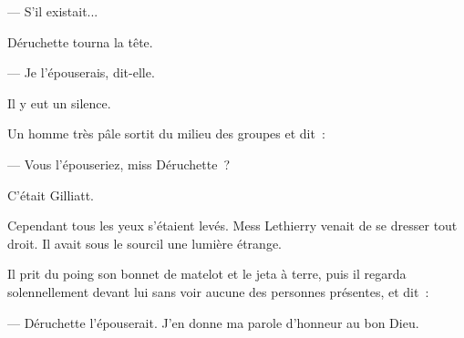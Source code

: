 \documentclass[french,twoside]{book} %
\begin{document}
— S’il existait...\par
Déruchette tourna la tête.\par
— Je l’épouserais, dit-elle.\par
Il y eut un silence.\par
Un homme très pâle sortit du milieu des groupes et dit :\par
— Vous l’épouseriez, miss Déruchette ?\par
C’était Gilliatt.\par
Cependant tous les yeux s’étaient levés. Mess Lethierry venait de se dresser tout droit. Il avait sous le sourcil une lumière étrange.\par
Il prit du poing son bonnet de matelot et le jeta à terre, puis il regarda solennellement devant lui sans voir aucune des personnes présentes, et dit :\par
— Déruchette l’épouserait. J’en donne ma parole d’honneur au bon Dieu.
\end{document}

